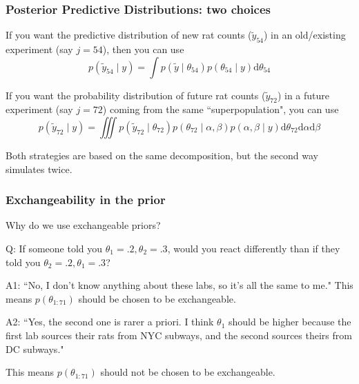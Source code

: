 \documentclass{beamer}
\begin{document}
\begin{frame}
\frametitle{Posterior Predictive Distributions: two choices}

If you want the predictive distribution of new rat counts ($\tilde{y}_{54}$) in an old/existing experiment (say $j=54$), then you can use
\[
p(\tilde{y}_{54} \mid y) = \int p(\tilde{y} \mid \theta_{54})p(\theta_{54} \mid y) \text{d}\theta_{54}
\]

If you want the probability distribution of future rat counts ($\tilde{y}_{72}$) in a future experiment (say $j=72$) coming from the same ``superpopulation", you can use
\[
p(\tilde{y}_{72} \mid y) = \iiint p(\tilde{y}_{72} \mid \theta_{72})p(\theta_{72} \mid \alpha, \beta)p(\alpha,\beta \mid y) \text{d}\theta_{72}\text{d}\alpha \text{d}\beta
\]

Both strategies are based on the same decomposition, but the second way simulates twice.
\end{frame}

\begin{frame}
\frametitle{Exchangeability in the prior}

Why do we use exchangeable priors?
\newline

Q: If someone told you $\theta_1 = .2, \theta_2 =.3$, would you react differently than if they told you $\theta_2 = .2, \theta_1 =.3$?
\pause
\newline

A1: ``No, I don't know anything about these labs, so it's all the same to me." 
\newline
This means $p(\theta_{1:71})$ should be chosen to be exchangeable.
\newline


A2: ``Yes, the second one is rarer a priori. I think $\theta_1$ should be higher because the first lab sources their rats from NYC subways, and the second sources theirs from DC subways." 
\newline

This means $p(\theta_{1:71})$ should not be chosen to be exchangeable.


\end{frame}
\end{document}
